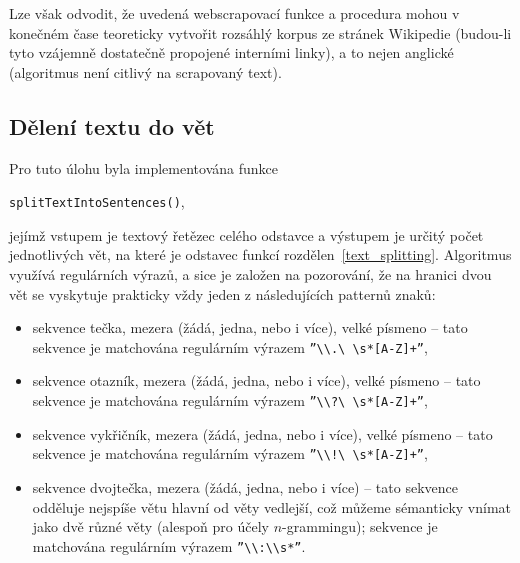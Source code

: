 Lze však odvodit, že uvedená webscrapovací funkce a procedura mohou v konečném
čase teoreticky vytvořit rozsáhlý korpus ze stránek Wikipedie (budou-li
tyto vzájemně dostatečně propojené interními linky), a to nejen anglické
(algoritmus není citlivý na scrapovaný text).


\subsection{Dělení textu do vět}

Pro tuto úlohu byla implementována funkce 

\begin{center}
\texttt{splitTextIntoSentences()},
\end{center}

jejímž vstupem je textový řetězec celého odstavce a výstupem je určitý počet
jednotlivých vět, na které je odstavec funkcí rozdělen~\ref{text_splitting}.
Algoritmus využívá regulárních výrazů,
a sice je založen na pozorování, že na
hranici dvou vět se vyskytuje prakticky vždy jeden z následujících patternů
znaků:

\begin{itemize}
  \item sekvence tečka, mezera (žádá, jedna, nebo i více), velké písmeno
  -- tato sekvence je matchována regulárním výrazem
  \texttt{''\textbackslash \textbackslash .\textbackslash
          \textbackslash s*[A-Z]+''},
  \item sekvence otazník, mezera (žádá, jedna, nebo i více), velké písmeno
  -- tato sekvence je matchována regulárním výrazem
  \texttt{''\textbackslash \textbackslash ?\textbackslash
          \textbackslash s*[A-Z]+''},
  \item sekvence vykřičník, mezera (žádá, jedna, nebo i více), velké písmeno
  -- tato sekvence je matchována regulárním výrazem
  \texttt{''\textbackslash \textbackslash !\textbackslash
          \textbackslash s*[A-Z]+''},
  \item sekvence dvojtečka, mezera (žádá, jedna, nebo i více)
  -- tato sekvence odděluje nejspíše větu hlavní od věty vedlejší,
  což můžeme sémanticky vnímat jako dvě různé věty (alespoň pro účely
  $n$-grammingu); sekvence je matchována regulárním výrazem%
  \texttt{''\textbackslash \textbackslash :\textbackslash \textbackslash s*''}.
\end{itemize}

